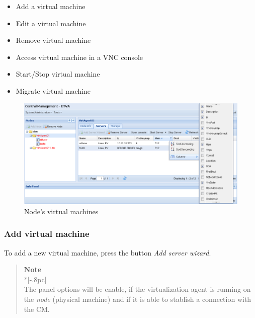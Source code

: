\begin{itemize}
	\item Add a virtual machine
    \item Edit a virtual machine
	\item Remove virtual machine
	\item Access virtual machine in a VNC console
	\item Start/Stop virtual machine
    \item Migrate virtual machine
\end{itemize}
\begin{figure}[H]
	\begin{center}
	\includegraphics[scale=0.45]{screenshots/node_servers.png}
	\caption{Node's virtual machines}
	\label{fig:node_servers}
	\end{center}
\end{figure}

\subsubsection{Add virtual machine}
\label{sec:add_server}

To add a new virtual machine, press the button \emph{Add server wizard}.
\begin{quote}
	{\large \bf Note} \\*[-.8pc]
	\underline{\hspace{6in}} \\
    The panel options will be enable, if the virtualization agent is running on the \emph{node} (physical machine) and if it is able to stablish a connection with the CM.
\end{quote}
 

